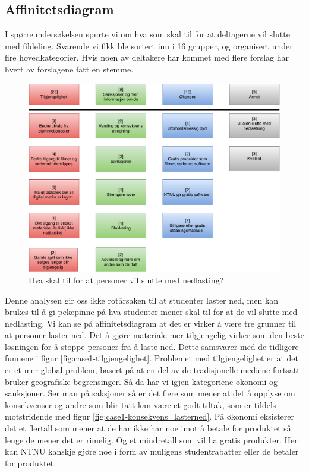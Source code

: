 \subsection{Affinitetsdiagram}
I spørreundersøkelsen spurte vi om hva som skal til for at deltagerne vil slutte med fildeling. Svarende vi fikk ble sortert inn i 16 grupper, og organisert under fire hovedkategorier. Hvis noen av deltakere har kommet med flere forslag har hvert av forslagene fått en stemme.  

\begin{figure}[H]
    \centering
    \includegraphics[scale=0.6]{case_1/bilder/stoppe_nedlastning.pdf}
    \caption[Slutte med nedlasting]{Hva skal til for at personer vil slutte med nedlasting?}
    \label{fig:case1-stoppe_nedlastning}
\end{figure}

Denne analysen gir oss ikke rotårsaken til at studenter laster ned, men kan brukes til å gi pekepinne på hva studenter mener skal til for at de vil slutte med nedlasting. Vi kan se på affinitetsdiagram at det er virker å være tre grunner til at personer laster ned. Det å gjøre materiale mer tilgjengelig virker som den beste løsningen for å stoppe personer fra å laste ned. Dette samsvarer med de tidligere funnene i figur \ref{fig:case1-tilgjengelighet}. Problemet med tilgjengelighet er at det er et mer global problem, basert på at en del av de tradisjonelle mediene fortsatt bruker geografiske begrensinger. Så da har vi igjen kategoriene økonomi og sanksjoner. Ser man på saksjoner så er det flere som mener at det å opplyse om konsekvenser og andre som blir tatt kan være et godt tiltak, som er tildels motstridende med figur \ref{fig:case1-konsekvens_lasterned}. På økonomi eksisterer det et flertall som mener at de har ikke har noe imot å betale for produktet så lenge de mener det er rimelig. Og et mindretall som vil ha gratis produkter. Her kan NTNU kanskje gjøre noe i form av muligens studentrabatter eller de betaler for produktet.

